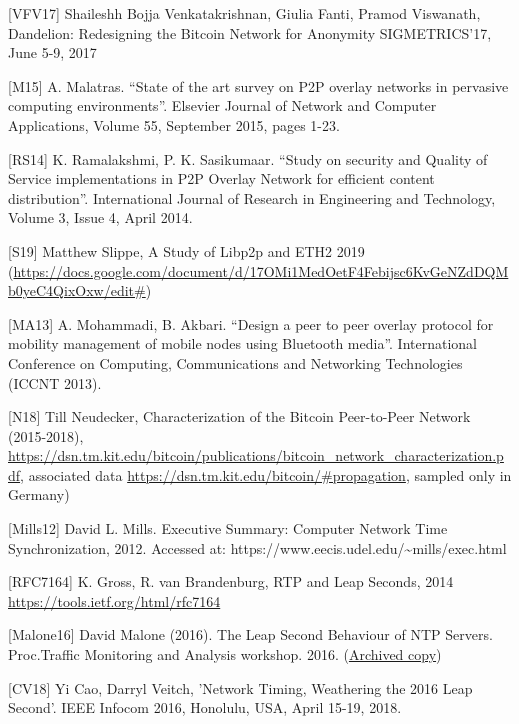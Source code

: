 \documentclass[11pt,a4paper]{article}
\begin{document}
{[}VFV17{]} Shaileshh Bojja Venkatakrishnan, Giulia Fanti, Pramod
Viswanath, Dandelion: Redesigning the Bitcoin Network for Anonymity
SIGMETRICS'17, June 5-9, 2017

{[}M15{]} A. Malatras. ``State of the art survey on P2P overlay networks
in pervasive computing environments''. Elsevier Journal of Network and
Computer Applications, Volume 55, September 2015, pages 1-23.

{[}RS14{]} K. Ramalakshmi, P. K. Sasikumaar. ``Study on security and
Quality of Service implementations in P2P Overlay Network for efficient
content distribution''. International Journal of Research in Engineering
and Technology, Volume 3, Issue 4, April 2014.

{[}S19{]} Matthew Slippe, A Study of Libp2p and ETH2 2019
(\href{https://docs.google.com/document/d/17OMi1MedOetF4Febijsc6KvGeNZdDQMb0yeC4QixOxw/edit\#}{{https://docs.google.com/document/d/17OMi1MedOetF4Febijsc6KvGeNZdDQMb0yeC4QixOxw/edit\#}})

{[}MA13{]} A. Mohammadi, B. Akbari. ``Design a peer to peer overlay
protocol for mobility management of mobile nodes using Bluetooth
media''. International Conference on Computing, Communications and
Networking Technologies (ICCNT 2013).

{[}N18{]} Till Neudecker, Characterization of the Bitcoin Peer-to-Peer
Network (2015-2018),
\href{https://dsn.tm.kit.edu/bitcoin/publications/bitcoin_network_characterization.pdf}{{https://dsn.tm.kit.edu/bitcoin/publications/bitcoin\_network\_characterization.pdf}},
associated data
\href{https://dsn.tm.kit.edu/bitcoin/\#propagation}{{https://dsn.tm.kit.edu/bitcoin/\#propagation}},
sampled only in Germany)

{[}Mills12{]} David L. Mills. Executive Summary: Computer Network Time
Synchronization, 2012. Accessed at:
https://www.eecis.udel.edu/\textasciitilde{}mills/exec.html

{[}RFC7164{]} K. Gross, R. van Brandenburg, RTP and Leap Seconds, 2014
\href{https://tools.ietf.org/html/rfc7164}{{https://tools.ietf.org/html/rfc7164}}

{[}Malone16{]} David Malone (2016). The Leap Second Behaviour of NTP
Servers. Proc.Traffic Monitoring and Analysis workshop. 2016.
(\href{https://web.archive.org/web/20161023201948/http://tma.ifip.org/2016/papers/tma2016-final27.pdf}{{Archived
copy}})

{[}CV18{]} Yi Cao, Darryl Veitch, 'Network Timing, Weathering the 2016
Leap Second'. IEEE Infocom 2016, Honolulu, USA, April 15-19, 2018.
\end{document}
